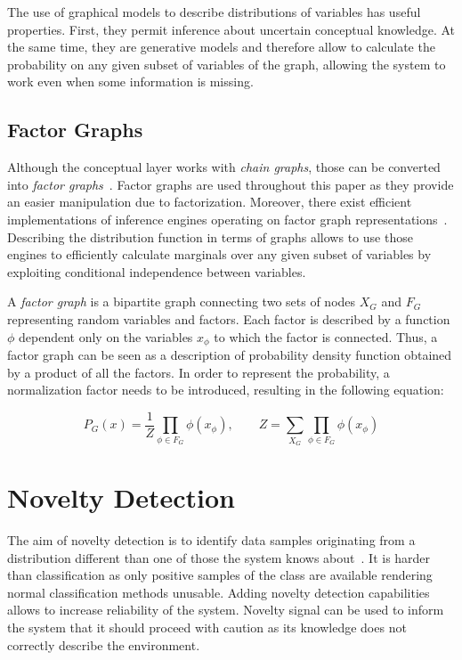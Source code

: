 \documentclass[runningheads,a4paper]{llncs}
\begin{document}
The use of graphical models to describe distributions of variables has useful properties.
First, they permit inference about uncertain conceptual knowledge. At the same time, they are 
generative models and therefore allow to calculate the probability
on any given subset of variables of the graph, allowing the system to work even when some
information is missing.


\subsection{Factor Graphs}
Although the conceptual layer works with \emph{chain graphs}, those can be converted
into \emph{factor graphs}~\cite{kschischang2001factor}. Factor graphs are used throughout this paper as they provide an
easier manipulation due to factorization.
Moreover, there exist efficient implementations of inference engines operating on factor graph
representations~\cite{Mooij_libDAI_10}.
Describing the distribution function in terms of graphs allows to use those engines to
efficiently calculate marginals over any given subset of variables by exploiting conditional
independence between variables.

A \emph{factor graph} is a bipartite graph connecting two sets of nodes $X_G$ and $F_G$
representing random variables and factors.
Each factor is described by a function $\phi$ dependent only on the variables $x_\phi$
to which the factor is connected.
Thus, a factor graph can be seen as a description of probability density function obtained
by a product of all the factors. In order to represent the probability,
a normalization factor needs to be introduced, resulting in the following equation:

\begin{equation}
P_G(x) = \frac{1}{Z}\prod_{\phi \in F_G}{\phi(x_{\phi})},\qquad
Z = \sum_{X_G}\prod_{\phi \in F_G}{\phi(x_{\phi})}
\end{equation}


\section{Novelty Detection}
\label{sec:novelty-detection}
The aim of novelty detection is to identify data samples originating from a distribution different than one of those
the system knows about~\cite{markou2003novelty}.
It is harder than classification as only positive samples of the class are available
rendering normal classification methods unusable. Adding novelty detection capabilities allows to increase 
reliability of the system. Novelty signal can be used to inform the system that it should proceed
with caution as its knowledge does not correctly describe the environment.
\end{document}
